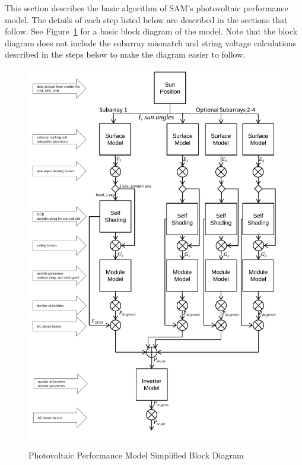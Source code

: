 \documentclass[12pt,letterpaper]{article}
\begin{document}
This section describes the basic algorithm of SAM's photovoltaic performance model. The details of each step listed below are described in the sections that follow. See Figure~\ref{fig-pvsamschematic} for a basic block diagram of the model. Note that the block diagram does not include the subarray mismatch and string voltage calculations described in the steps below to make the diagram easier to follow.

\begin{figure}
\begin{center}
\includegraphics[scale=0.88]{pvsam-schematic}
\caption{Photovoltaic Performance Model Simplified Block Diagram}
\label{fig-pvsamschematic}
\end{center}
\end{figure}
 
\end{document}
